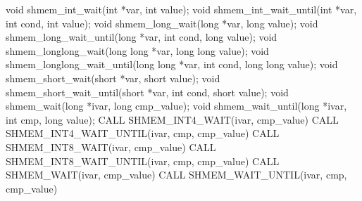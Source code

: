 \synC   %
void shmem_int_wait(int *var, int value);
void shmem_int_wait_until(int *var, int cond, int value);
void shmem_long_wait(long *var, long value);
void shmem_long_wait_until(long *var, int cond, long value);
void shmem_longlong_wait(long long *var, long long value);
void shmem_longlong_wait_until(long long *var, int cond,  long  long value);
void shmem_short_wait(short *var, short value);
void shmem_short_wait_until(short *var, int cond, short value);
void shmem_wait(long *ivar, long cmp_value);
void shmem_wait_until(long *ivar, int cmp, long value);
\synF   %
CALL SHMEM_INT4_WAIT(ivar, cmp_value)
CALL SHMEM_INT4_WAIT_UNTIL(ivar, cmp, cmp_value)
CALL SHMEM_INT8_WAIT(ivar, cmp_value)
CALL SHMEM_INT8_WAIT_UNTIL(ivar, cmp, cmp_value)
CALL SHMEM_WAIT(ivar, cmp_value)
CALL SHMEM_WAIT_UNTIL(ivar, cmp, cmp_value)

